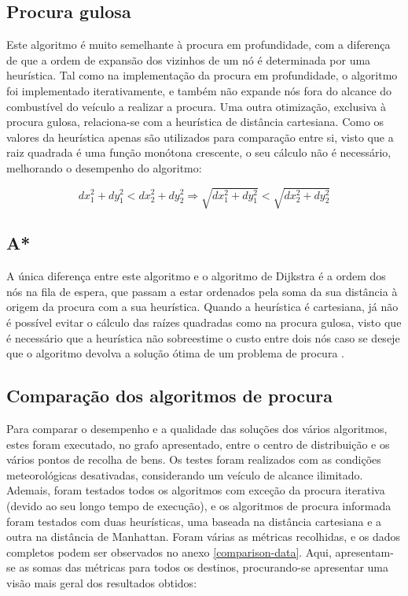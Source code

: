 \documentclass[12pt, a4paper, titlepage]{article}
\begin{document}
\subsection{Procura gulosa}

Este algoritmo é muito semelhante à procura em profundidade, com a diferença de que a ordem de
expansão dos vizinhos de um nó é determinada por uma heurística. Tal como na implementação da
procura em profundidade, o algoritmo foi implementado iterativamente, e também não expande nós
fora do alcance do combustível do veículo a realizar a procura. Uma outra otimização, exclusiva à
procura gulosa, relaciona-se com a heurística de distância cartesiana. Como os valores da
heurística apenas são utilizados para comparação entre si, visto que a raiz quadrada é uma função
monótona crescente, o seu cálculo não é necessário, melhorando o desempenho do algoritmo:

$$
    dx_1^2 + dy_1^2 < dx_2^2 + dy_2^2
    \Rightarrow
    \sqrt{dx_1^2 + dy_1^2} < \sqrt{dx_2^2 + dy_2^2}
$$

\subsection{A*}

A única diferença entre este algoritmo e o algoritmo de Dijkstra é a ordem dos nós na fila de
espera, que passam a estar ordenados pela soma da sua distância à origem da procura com a sua
heurística. Quando a heurística é cartesiana, já não é possível evitar o cálculo das raízes
quadradas como na procura gulosa, visto que é necessário que a heurística não sobreestime o custo
entre dois nós caso se deseje que o algoritmo devolva a solução ótima de um problema de procura
\cite{aima}.

\subsection{Comparação dos algoritmos de procura}

Para comparar o desempenho e a qualidade das soluções dos vários algoritmos, estes foram executado,
no grafo apresentado, entre o centro de distribuição e os vários pontos de recolha de bens. Os
testes foram realizados com as condições meteorológicas desativadas, considerando um veículo de
alcance ilimitado. Ademais, foram testados todos os algoritmos com exceção da procura iterativa
(devido ao seu longo tempo de execução), e os algoritmos de procura informada foram testados com
duas heurísticas, uma baseada na distância cartesiana e a outra na distância de Manhattan. Foram
várias as métricas recolhidas, e os dados completos podem ser observados no anexo
\ref{comparison-data}. Aqui, apresentam-se as somas das métricas para todos os destinos,
procurando-se apresentar uma visão mais geral dos resultados obtidos:
\end{document}
